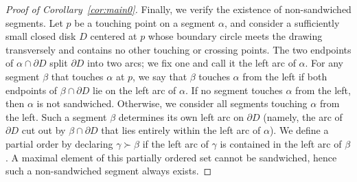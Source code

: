 \documentclass[10pt,a4paper]{amsart}
\begin{document}
\begin{proof}[Proof of Corollary~\ref{cor:main0}]
Finally, we verify the existence of non-sandwiched segments. Let $p$ be a touching point on a segment $\alpha$, and consider a sufficiently small closed disk $D$ centered at $p$ whose boundary circle meets the drawing transversely and contains no other touching or crossing points. The two endpoints of $\alpha\cap \partial D$ split $\partial D$ into two arcs; we fix one and call it the left arc of $\alpha$. For any segment $\beta$ that touches $\alpha$ at $p$, we say that $\beta$ touches $\alpha$ from the left if both endpoints of $\beta\cap \partial D$ lie on the left arc of $\alpha$. If no segment touches $\alpha$ from the left, then $\alpha$ is not sandwiched. Otherwise, we consider all segments touching $\alpha$ from the left. Such a segment $\beta$ determines its own left arc on $\partial D$ (namely, the arc of $\partial D$ cut out by $\beta\cap \partial D$ that lies entirely within the left arc of $\alpha$). We define a partial order by declaring $\gamma \succ \beta$ if the left arc of $\gamma$ is contained in the left arc of $\beta$. A maximal element of this partially ordered set cannot be sandwiched, hence such a non-sandwiched segment always exists.
\end{proof}
\end{document}
